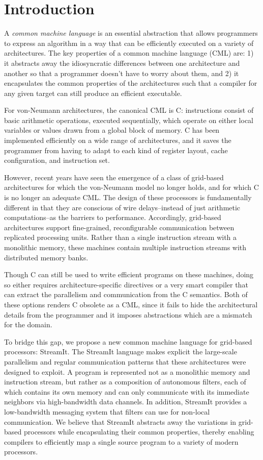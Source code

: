 \section{Introduction}

A {\it common machine language} is an essential abstraction that
allows programmers to express an algorithm in a way that can be
efficiently executed on a variety of architectures.  The key
properties of a common machine language (CML) are: 1) it abstracts
away the idiosyncratic differences between one architecture and
another so that a programmer doesn't have to worry about them, and 2)
it encapsulates the common properties of the architectures such that a
compiler for any given target can still produce an efficient
executable.

For von-Neumann architectures, the canonical CML is C: instructions
consist of basic arithmetic operations, executed sequentially, which
operate on either local variables or values drawn from a global block
of memory.  C has been implemented efficiently on a wide range of
architectures, and it saves the programmer from having to adapt to
each kind of register layout, cache configuration, and instruction
set.

However, recent years have seen the emergence of a class of grid-based
architectures \cite{smartmemories, raw, trips} for which the
von-Neumann model no longer holds, and for which C is no longer an
adequate CML.  The design of these processors is fundamentally
different in that they are conscious of wire delays--instead of just
arithmetic computations--as the barriers to performance.  Accordingly,
grid-based architectures support fine-grained, reconfigurable
communication between replicated processing units.  Rather than a
single instruction stream with a monolithic memory, these machines
contain multiple instruction streams with distributed memory banks.

Though C can still be used to write efficient programs on these
machines, doing so either requires architecture-specific directives or
a very smart compiler that can extract the parallelism and
communication from the C semantics.  Both of these options renders C
obsolete as a CML, since it fails to hide the architectural details
from the programmer and it imposes abstractions which are a mismatch
for the domain.

To bridge this gap, we propose a new common machine language for
grid-based processors: StreamIt.  The StreamIt language makes explicit
the large-scale parallelism and regular communication patterns that
these architectures were designed to exploit.  A program is
represented not as a monolithic memory and instruction stream, but
rather as a composition of autonomous filters, each of which contains
its own memory and can only communicate with its immediate neighbors
via high-bandwidth data channels.  In addition, StreamIt provides a
low-bandwidth messaging system that filters can use for non-local
communication.  We believe that StreamIt abstracts away the variations
in grid-based processors while encapsulating their common properties,
thereby enabling compilers to efficiently map a single source program
to a variety of modern processors.